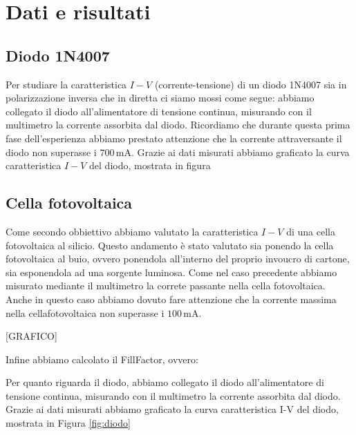 \section*{Dati e risultati}

\subsection*{Diodo 1N4007}

Per studiare la caratteristica $I-V$ (corrente-tensione) di un diodo 1N4007 sia in polarizzazione inversa che in diretta ci siamo mossi come segue: abbiamo collegato il diodo all'alimentatore di tensione continua, misurando con il multimetro la corrente assorbita dal diodo.
Ricordiamo che durante questa prima fase dell'esperienza abbiamo prestato attenzione che la corrente attraversante il diodo non superasse i $700\,\si{\milli\ampere}$. Grazie ai dati misurati abbiamo graficato la curva caratteristica $I-V$ del diodo, mostrata in figura %

\subsection*{Cella fotovoltaica}

Come secondo obbiettivo abbiamo valutato la caratteristica $I-V$ di una cella fotovoltaica al silicio. Questo andamento è stato valutato sia ponendo la cella fotovoltaica al buio, ovvero ponendola all'interno del proprio invoucro di cartone, sia esponendola ad una sorgente luminosa.
Come nel caso precedente abbiamo misurato mediante il multimetro la correte passante nella cella fotovoltaica.
Anche in questo caso abbiamo dovuto fare attenzione che la corrente massima nella cellafotovoltaica non superasse i $100\,\si{\milli\ampere}$.

[GRAFICO]

Infine abbiamo calcolato il FillFactor, ovvero:


Per quanto riguarda il diodo, abbiamo collegato il diodo all'alimentatore di tensione continua,
misurando con il multimetro la corrente assorbita dal diodo. Grazie ai dati misurati abbiamo graficato
la curva caratteristica I-V del diodo, mostrata in Figura \ref{fig:diodo}

